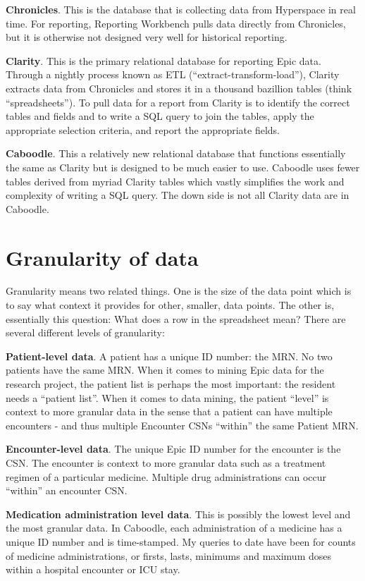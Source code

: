 \documentclass[
]{report}
\begin{document}
\textbf{Chronicles}. This is the database that is collecting data from
Hyperspace in real time. For reporting, Reporting Workbench pulls data
directly from Chronicles, but it is otherwise not designed very well for
historical reporting.

\textbf{Clarity}. This is the primary relational database for reporting
Epic data. Through a nightly process known as ETL
(``extract-transform-load''), Clarity extracts data from Chronicles and
stores it in a thousand bazillion tables (think ``spreadsheets''). To
pull data for a report from Clarity is to identify the correct tables
and fields and to write a SQL query to join the tables, apply the
appropriate selection criteria, and report the appropriate fields.

\textbf{Caboodle}. This a relatively new relational database that
functions essentially the same as Clarity but is designed to be much
easier to use. Caboodle uses fewer tables derived from myriad Clarity
tables which vastly simplifies the work and complexity of writing a SQL
query. The down side is not all Clarity data are in Caboodle.

\hypertarget{granularity-of-data}{%
\section{Granularity of data}\label{granularity-of-data}}

Granularity means two related things. One is the size of the data point
which is to say what context it provides for other, smaller, data
points. The other is, essentially this question: What does a row in the
spreadsheet mean? There are several different levels of granularity:

\textbf{Patient-level data}. A patient has a unique ID number: the MRN.
No two patients have the same MRN. When it comes to mining Epic data for
the research project, the patient list is perhaps the most important:
the resident needs a ``patient list''. When it comes to data mining, the
patient ``level'' is context to more granular data in the sense that a
patient can have multiple encounters - and thus multiple Encounter CSNs
``within'' the same Patient MRN.

\textbf{Encounter-level data}. The unique Epic ID number for the
encounter is the CSN. The encounter is context to more granular data
such as a treatment regimen of a particular medicine. Multiple drug
administrations can occur ``within'' an encounter CSN.

\textbf{Medication administration level data}. This is possibly the
lowest level and the most granular data. In Caboodle, each
administration of a medicine has a unique ID number and is time-stamped.
My queries to date have been for counts of medicine administrations, or
firsts, lasts, minimums and maximum doses within a hospital encounter or
ICU stay.
\end{document}
